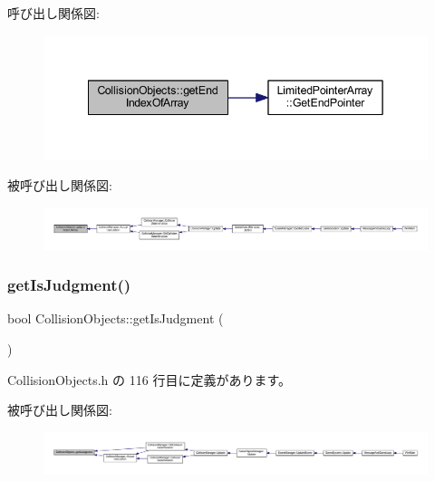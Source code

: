 呼び出し関係図\+:\nopagebreak
\begin{figure}[H]
\begin{center}
\leavevmode
\includegraphics[width=342pt]{class_collision_objects_a309eef4695b4a19f389eaf5d0753c256_cgraph}
\end{center}
\end{figure}
被呼び出し関係図\+:
\nopagebreak
\begin{figure}[H]
\begin{center}
\leavevmode
\includegraphics[width=350pt]{class_collision_objects_a309eef4695b4a19f389eaf5d0753c256_icgraph}
\end{center}
\end{figure}
\mbox{\label{class_collision_objects_a1320a57aae5798c04e65b2b7c8433aae}} 
\subsubsection{\texorpdfstring{get\+Is\+Judgment()}{getIsJudgment()}}
{\footnotesize\ttfamily bool Collision\+Objects\+::get\+Is\+Judgment (\begin{DoxyParamCaption}{ }\end{DoxyParamCaption})\hspace{0.3cm}{\ttfamily [inline]}}



 Collision\+Objects.\+h の 116 行目に定義があります。

被呼び出し関係図\+:
\nopagebreak
\begin{figure}[H]
\begin{center}
\leavevmode
\includegraphics[width=350pt]{class_collision_objects_a1320a57aae5798c04e65b2b7c8433aae_icgraph}
\end{center}
\end{figure}
\mbox{\label{class_collision_objects_a344311b0c469e591a112eb1d6b0247cb}} 
